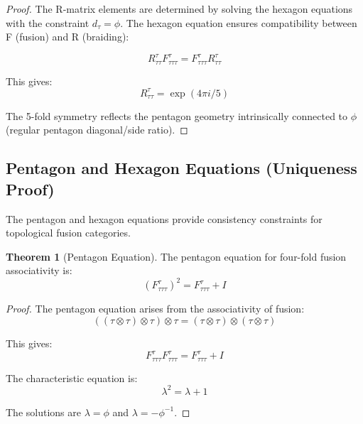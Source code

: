 \documentclass[11pt]{article}
\theoremstyle{definition}
\newtheorem{theorem}{Theorem}[section]
\newcommand{\goldenratio}{\phi}
\begin{document}
\begin{proof}
The R-matrix elements are determined by solving the hexagon equations with the constraint $d_\tau = \goldenratio$. The hexagon equation ensures compatibility between F (fusion) and R (braiding):

\begin{equation}
R^{\tau}_{\tau\tau} F^{\tau}_{\tau\tau\tau} = F^{\tau}_{\tau\tau\tau} R^{\tau}_{\tau\tau}
\end{equation}

This gives:
\begin{equation}
R^{\tau}_{\tau\tau} = \exp(4\pi i/5)
\end{equation}

The 5-fold symmetry reflects the pentagon geometry intrinsically connected to $\goldenratio$ (regular pentagon diagonal/side ratio).
\end{proof}

\subsection{Pentagon and Hexagon Equations (Uniqueness Proof)}

The pentagon and hexagon equations provide consistency constraints for topological fusion categories.

\begin{theorem}[Pentagon Equation]
The pentagon equation for four-fold fusion associativity is:
\begin{equation}
(F^{\tau}_{\tau\tau\tau})^2 = F^{\tau}_{\tau\tau\tau} + I
\end{equation}
\end{theorem}

\begin{proof}
The pentagon equation arises from the associativity of fusion:
\begin{equation}
((\tau \otimes \tau) \otimes \tau) \otimes \tau = (\tau \otimes \tau) \otimes (\tau \otimes \tau)
\end{equation}

This gives:
\begin{equation}
F^{\tau}_{\tau\tau\tau} F^{\tau}_{\tau\tau\tau} = F^{\tau}_{\tau\tau\tau} + I
\end{equation}

The characteristic equation is:
\begin{equation}
\lambda^2 = \lambda + 1
\end{equation}

The solutions are $\lambda = \goldenratio$ and $\lambda = -\goldenratio^{-1}$.
\end{proof}
\end{document}
